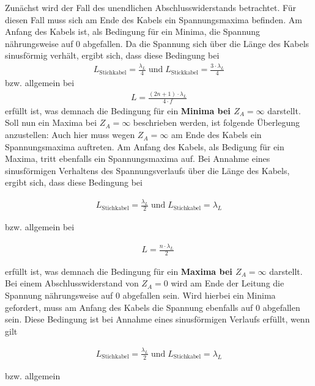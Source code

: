 \documentclass[a4paper,twoside,final]{article}
\begin{document}
Zunächst wird der Fall des unendlichen Abschlusswiderstands betrachtet. Für diesen Fall muss sich am Ende des Kabels ein Spannungsmaxima befinden. Am Anfang des Kabels ist, als Bedingung für ein Minima, die Spannung nährungsweise auf 0 abgefallen. Da die Spannung sich über die Länge des Kabels sinusförmig verhält, ergibt sich, dass diese Bedingung bei
\begin{align}
  L_{\text{Stichkabel}} = \frac{\lambda_{L}}{4} \; \text{und} \; L_{\text{Stickkabel}} = \frac{3\cdot \lambda_{L}}{4}
\end{align}
bzw. allgemein bei
\begin{align}
L = \frac{(2n+1)\cdot \lambda_{L}}{4\cdot f}
\end{align}
erfüllt ist, was demnach die Bedingung für ein \textbf{Minima bei $Z_A = \infty$} darstellt. \\
Soll nun ein Maxima bei $Z_A = \infty$ beschrieben werden, ist folgende Überlegung anzustellen: Auch hier muss wegen $Z_A=\infty$ am Ende des Kabels ein Spannungsmaxima auftreten. Am Anfang des Kabels, als Bedigung für ein Maxima, tritt ebenfalls ein Spannungsmaxima auf. Bei Annahme eines sinusförmigen Verhaltens des Spannungsverlaufs über die Länge des Kabels, ergibt sich, dass diese Bedingung bei

\begin{align}
L_{\text{Stichkabel}} = \frac{\lambda_{L}}{2} \; \text{und} \; L_{\text{Stichkabel}} = \lambda_{L}
\end{align}

bzw. allgemein bei

\begin{align}
L = \frac{n \cdot \lambda_{L}}{2} \;
\end{align}

erfüllt ist, was demnach die Bedingung für ein \textbf{Maxima bei $Z_A = \infty$} darstellt. \\

Bei einem Abschlusswiderstand von $Z_A = 0$ wird am Ende der Leitung die Spannung nährungsweise auf 0 abgefallen sein. Wird hierbei ein Minima gefordert, muss am Anfang des Kabels die Spannung ebenfalls auf 0 abgefallen sein. Diese Bedingung ist bei Annahme eines sinusförmigen Verlaufs erfüllt, wenn gilt

\begin{align}
L_{\text{Stichkabel}} = \frac{\lambda_{L}}{2} \; \text{und} \; L_{\text{Stichkabel}} = \lambda_{L}
\end{align}

bzw. allgemein
\end{document}
